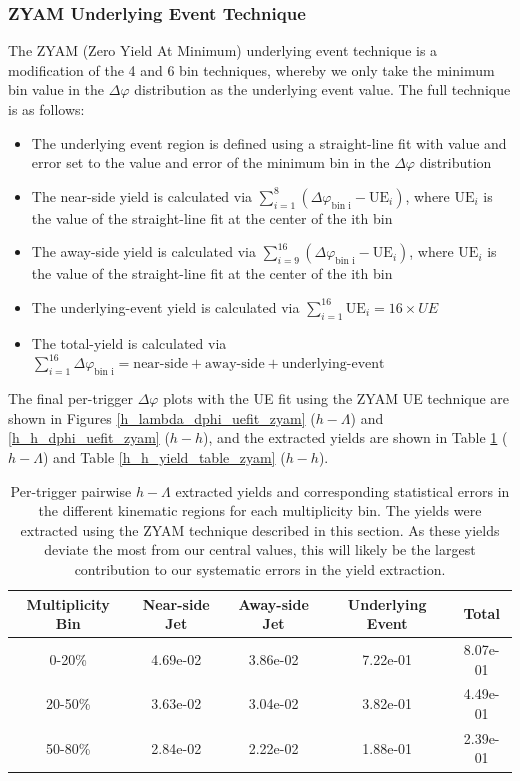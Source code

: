 \documentclass[ALICE,manyauthors]{ALICE_analysis_notes}
\begin{document}
\clearpage



\subsubsection{ZYAM Underlying Event Technique}
\label{zyam}
The ZYAM (Zero Yield At Minimum) underlying event technique is a modification of the 4 and 6 bin techniques, whereby we only take the minimum bin value in the $\Delta\varphi$ distribution as the underlying event value. The full technique is as follows:

\begin{itemize}
\item The underlying event region is defined using a straight-line fit with value and error set to the value and error of the minimum bin in the $\Delta\varphi$ distribution
\item The near-side yield is calculated via $\sum_{i=1}^{8} (\Delta\varphi_\text{bin i} - \text{UE}_i)$, where $\text{UE}_i$ is the value of the straight-line fit at the center of the ith bin
\item The away-side yield is calculated via $\sum_{i=9}^{16} (\Delta\varphi_\text{bin i} - \text{UE}_i)$, where $\text{UE}_i$ is the value of the straight-line fit at the center of the ith bin
\item The underlying-event yield is calculated via $\sum_{i=1}^{16} \text{UE}_i = 16 \times UE$
\item The total-yield is calculated via $\sum_{i=1}^{16} \Delta\varphi_\text{bin i} = \text{near-side} + \text{away-side} + \text{underlying-event}$
\end{itemize}

The final per-trigger $\Delta\varphi$ plots with the UE fit using the ZYAM UE technique are shown in Figures \ref{h_lambda_dphi_uefit_zyam} ($h-\Lambda$) and \ref{h_h_dphi_uefit_zyam} ($h-h$), and the extracted yields are shown in Table \ref{h_lambda_yield_table_zyam} ($h-\Lambda$) and Table \ref{h_h_yield_table_zyam} ($h-h$).

\begin{table}[h!]
\centering
\begin{tabular}{| c || c | c | c | c | }
\hline
Multiplicity Bin & Near-side Jet & Away-side Jet & Underlying Event & Total  \\
\hline
	
0-20\% & 4.69e-02  & 3.86e-02  & 7.22e-01 & 8.07e-01 \\
20-50\% & 3.63e-02 & 3.04e-02  & 3.82e-01 & 4.49e-01 \\
50-80\% & 2.84e-02 & 2.22e-02  & 1.88e-01 & 2.39e-01 \\
	
\hline
\end{tabular}
\caption{Per-trigger pairwise $h-\Lambda$ extracted yields and corresponding statistical errors in the different kinematic regions for each multiplicity bin. The yields were extracted using the ZYAM technique described in this section. As these yields deviate the most from our central values, this will likely be the largest contribution to our systematic errors in the yield extraction.}
\label{h_lambda_yield_table_zyam}
\end{table}
	
\end{document}
